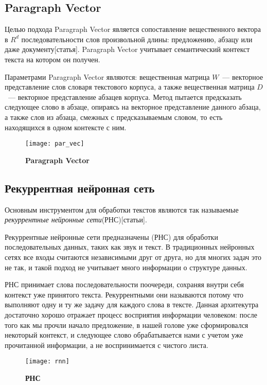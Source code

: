 \subsection{Paragraph Vector}
Целью подхода Paragraph Vector является сопоставление вещественного вектора в $R^d$ последовательности слов произвольной длины: предложению, абзацу или даже документу[статья].
Paragraph Vector учитывает семантический контекст текста на котором он получен.

Параметрами Paragraph Vector являются: вещественная матрица $W$~--- векторное представление слов словаря текстового корпуса, а также вещественная матрица $D$~--- векторное представление абзацев корпуса. Метод пытается предсказать следующее слово в абзаце, опираясь на векторное представление данного абзаца, а также слов из абзаца, смежных с предсказываемым словом, то есть находящихся в одном контексте с ним.

\begin{figure}[h]
\texttt{[image: par\_vec]}
\caption{\textbf{Paragraph Vector}}
\label{fig:par_vec}
\end{figure}

\subsection{Рекуррентная нейронная сеть}
Основным инструментом для обработки текстов являются так называемые \emph{рекуррентные нейронные сети}(РНС)[статьи].

Рекуррентные нейронные сети предназначены (РНС) для обработки последовательных данных, таких как звук и текст. В традиционных нейронных сетях все входы считаются независимыми друг от друга, но для многих задач это не так, и такой подход не учитывает много информации о структуре данных.

РНС принимает слова последовательности поочереди, сохраняя внутри себя контекст уже принятого текста. Рекуррентными они называются потому что выполняют одну и ту же задачу для каждого слова в тексте. Данная архитекутра достаточно хорошо отражает процесс восприятия информации человеком: после того как мы прочли начало предложение, в нашей голове уже сформировался некоторый контекст, и следующее слово обрабатывается нами с учетом уже прочитанной информации, а не воспринимается с чистого листа.

\begin{figure}[h]
\texttt{[image: rnn]}
\caption{\textbf{РНС}}
\label{fig:rnn}
\end{figure}

